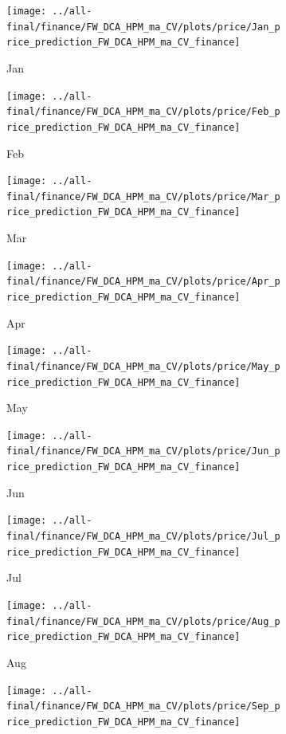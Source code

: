 \documentclass[ngerman]{ttlab-qualify}
\begin{document}
\newpage
\begin{figure}[H]
\centering
  \begin{subfigure}{.3\linewidth}
  \texttt{[image: ../all-final/finance/FW\_DCA\_HPM\_ma\_CV/plots/price/Jan\_price\_prediction\_FW\_DCA\_HPM\_ma\_CV\_finance]}\hfill
  \caption{Jan}
  \end{subfigure}
  \begin{subfigure}{.3\linewidth}
  \texttt{[image: ../all-final/finance/FW\_DCA\_HPM\_ma\_CV/plots/price/Feb\_price\_prediction\_FW\_DCA\_HPM\_ma\_CV\_finance]}\hfill
  \caption{Feb}
  \end{subfigure}
  \begin{subfigure}{.3\linewidth}
  \texttt{[image: ../all-final/finance/FW\_DCA\_HPM\_ma\_CV/plots/price/Mar\_price\_prediction\_FW\_DCA\_HPM\_ma\_CV\_finance]}\hfill
  \caption{Mar}
  \end{subfigure}\par\medskip
  \begin{subfigure}{.3\linewidth}
  \texttt{[image: ../all-final/finance/FW\_DCA\_HPM\_ma\_CV/plots/price/Apr\_price\_prediction\_FW\_DCA\_HPM\_ma\_CV\_finance]}\hfill
  \caption{Apr}
  \end{subfigure}
  \begin{subfigure}{.3\linewidth}
  \texttt{[image: ../all-final/finance/FW\_DCA\_HPM\_ma\_CV/plots/price/May\_price\_prediction\_FW\_DCA\_HPM\_ma\_CV\_finance]}\hfill
  \caption{May}
  \end{subfigure}
  \begin{subfigure}{.3\linewidth}
  \texttt{[image: ../all-final/finance/FW\_DCA\_HPM\_ma\_CV/plots/price/Jun\_price\_prediction\_FW\_DCA\_HPM\_ma\_CV\_finance]}\hfill
  \caption{Jun}
  \end{subfigure}\par\medskip
  \begin{subfigure}{.3\linewidth}
  \texttt{[image: ../all-final/finance/FW\_DCA\_HPM\_ma\_CV/plots/price/Jul\_price\_prediction\_FW\_DCA\_HPM\_ma\_CV\_finance]}\hfill
  \caption{Jul}
  \end{subfigure}
  \begin{subfigure}{.3\linewidth}
  \texttt{[image: ../all-final/finance/FW\_DCA\_HPM\_ma\_CV/plots/price/Aug\_price\_prediction\_FW\_DCA\_HPM\_ma\_CV\_finance]}\hfill
  \caption{Aug}
  \end{subfigure}
  \begin{subfigure}{.3\linewidth}
  \texttt{[image: ../all-final/finance/FW\_DCA\_HPM\_ma\_CV/plots/price/Sep\_price\_prediction\_FW\_DCA\_HPM\_ma\_CV\_finance]}\hfill

\end{subfigure}
\end{figure}
\end{document}
